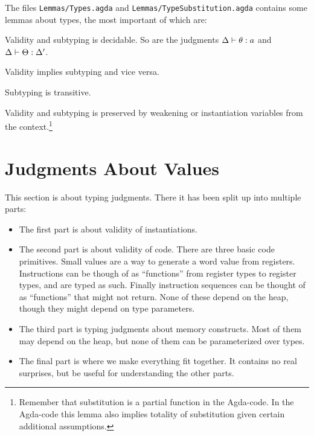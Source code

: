 The files \texttt{Lemmas/Types.agda} and \texttt{Lemmas/TypeSubstitution.agda}
contains some lemmas about types, the most important of which are:

\begin{lemma}
  \label{lemma:typdec}
  Validity and subtyping is decidable. So are the judgments
  ${\Delta} |- {\theta} : {a}$ and
  ${\Delta} |- {\Theta} : {\Delta'}$.
\end{lemma}

\begin{lemma}
  \label{lemma:typeq}
  Validity implies subtyping and vice versa.
\end{lemma}

\begin{lemma}
  \label{lemma:transitive}
  Subtyping is transitive.
\end{lemma}

\begin{lemma}
  \label{lemma:typ-context}
  Validity and subtyping is preserved by weakening or instantiation variables
  from the context.\footnote{Remember that substitution is a partial function in
    the Agda-code. In the Agda-code this lemma also implies totality of
    substitution given certain additional assumptions.}
\end{lemma}

\section{Judgments About Values}

This section is about typing judgments. There it has been split up into multiple
parts:

\begin{itemize}
\item The first part is about validity of instantiations.
\item The second part is about validity of code. There are three basic code
  primitives. Small values are a way to generate a word value from
  registers. Instructions can be though of as ``functions'' from register types
  to register types, and are typed as such. Finally instruction sequences can be
  thought of as ``functions'' that might not return. None of these depend on the
  heap, though they might depend on type parameters.
\item The third part is typing judgments about memory constructs. Most of them
  may depend on the heap, but none of them can be parameterized over types.
\item The final part is where we make everything fit together. It contains no
  real surprises, but be useful for understanding the other parts.
\end{itemize}

